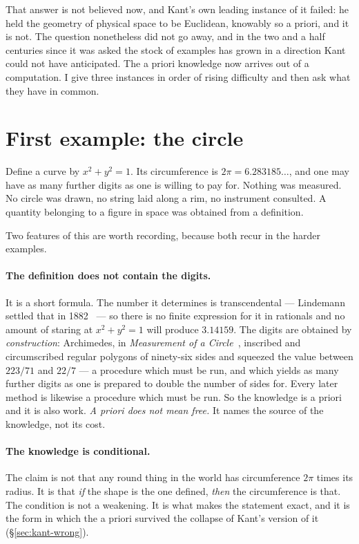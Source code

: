 \documentclass[11pt]{article}
\begin{document}
That answer is not believed now, and Kant's own leading instance of it failed: he held the geometry
of physical space to be Euclidean, knowably so a priori, and it is not. The question nonetheless did
not go away, and in the two and a half centuries since it was asked the stock of examples has grown
in a direction Kant could not have anticipated. The a priori knowledge now arrives out of a
computation. I give three instances in order of rising difficulty and then ask what they have in
common.

\section{First example: the circle}\label{sec:circle}

Define a curve by $x^2 + y^2 = 1$. Its circumference is $2\pi = 6.283185\ldots$, and one may have as
many further digits as one is willing to pay for. Nothing was measured. No circle was drawn, no
string laid along a rim, no instrument consulted. A quantity belonging to a figure in space was
obtained from a definition.

Two features of this are worth recording, because both recur in the harder examples.

\paragraph{The definition does not contain the digits.} It is a short formula. The number it
determines is transcendental --- Lindemann settled that in 1882~\cite{lindemann} --- so there is no
finite expression for it in rationals and no amount of staring at $x^2+y^2=1$ will produce
$3.14159$. The digits are obtained by \emph{construction}: Archimedes, in
\emph{Measurement of a Circle}~\cite{archimedes}, inscribed and circumscribed regular polygons of
ninety-six sides and squeezed the value between $223/71$ and $22/7$ --- a procedure which must be
run, and which yields as many further digits as one is prepared to double the number of sides for.
Every later method is likewise a procedure which must be run. So the knowledge is a priori and it is
also work. \emph{A priori does not mean free.} It names the
source of the knowledge, not its cost.

\paragraph{The knowledge is conditional.} The claim is not that any round thing in the world has
circumference $2\pi$ times its radius. It is that \emph{if} the shape is the one defined, \emph{then}
the circumference is that. The condition is not a weakening. It is what makes the statement exact,
and it is the form in which the a priori survived the collapse of Kant's version of it
(\S\ref{sec:kant-wrong}).
\end{document}
